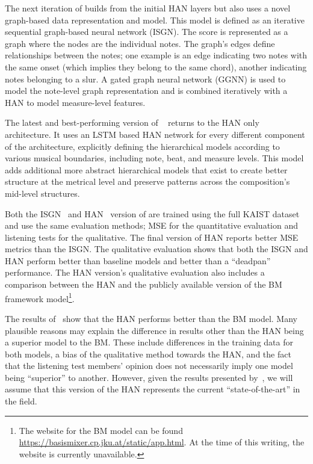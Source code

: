 The next iteration of \vnet{} builds from the initial HAN layers but also uses a novel graph-based data representation and model. This model is defined as an iterative sequential graph-based neural network (ISGN). The score is represented as a graph where the nodes are the individual notes. The graph's edges define relationships between the notes; one example is an edge indicating two notes with the same onset (which implies they belong to the same chord), another indicating notes belonging to a slur. A gated graph neural network (GGNN) is used to model the note-level graph representation and is combined iteratively with a HAN to model measure-level features. 

The latest and best-performing version of \vnet{}~\cite{jeong2019virtuosonet} returns to the HAN only architecture. It uses an LSTM based HAN network for every different component of the architecture, explicitly defining the hierarchical models according to various musical boundaries, including note, beat, and measure levels. This model adds additional more abstract hierarchical models that exist to create better structure at the metrical level and preserve patterns across the composition's mid-level structures.

Both the ISGN~\cite{jeong2019graph} and HAN~\cite{jeong2019virtuosonet} version of \vnet{} are trained using the full KAIST dataset and use the same evaluation methods; MSE for the quantitative evaluation and listening tests for the qualitative. The final version of HAN reports better MSE metrics than the ISGN. The qualitative evaluation shows that both the ISGN and HAN perform better than baseline models and better than a ``deadpan'' performance. The HAN version's qualitative evaluation also includes a comparison between the HAN and the publicly available version of the BM framework model\footnote{The website for the BM model can be found \href{here}{https://basismixer.cp.jku.at/static/app.html}. At the time of this writing, the website is currently unavailable.}. 

The results of~\citet{jeong2019virtuosonet} show that the HAN performs better than the BM model. Many plausible reasons may explain the difference in results other than the HAN being a superior model to the BM. These include differences in the training data for both models, a bias of the qualitative method towards the HAN, and the fact that the listening test members' opinion does not necessarily imply one model being ``superior'' to another. However, given the results presented by~\citet{jeong2019virtuosonet}, we will assume that this version of the HAN represents the current ``state-of-the-art'' in the field. 

